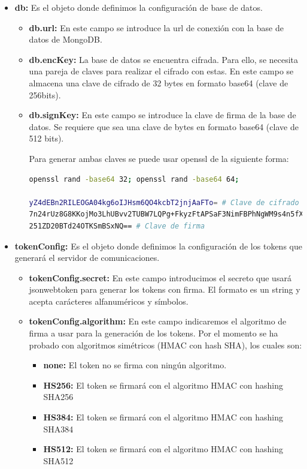 \documentclass[spanish,12pt, a4paper, twoside]{paper}
\begin{document}
\begin{itemize}
\item\textbf{db:} Es el objeto donde definimos la configuración de base de datos.
\begin{itemize}
\item\textbf{db.url:} En este campo se introduce la url de conexión con la base de datos de MongoDB.

\item\textbf{db.encKey:} La base de datos se encuentra cifrada. Para ello, se necesita una pareja de claves para realizar el cifrado con estas. En este campo se almacena una clave de cifrado de 32 bytes en formato base64 (clave de 256bits).

\item\textbf{db.signKey:} En este campo se introduce la clave de firma de la base de datos. Se requiere que sea una clave de bytes en formato base64 (clave de 512 bits).

Para generar ambas claves se puede usar openssl de la siguiente forma:
\begin{lstlisting}[language=sh]
openssl rand -base64 32; openssl rand -base64 64;

yZ4dEBn2RILEOGA04kg6oIJHsm6QO4kcbT2jnjAaFTo= # Clave de cifrado
7n24rUz8G8KKojMo3LhUBvv2TUBW7LQPg+FkyzFtAPSaF3NimFBPhNgWM9s4n5fX
251ZD20BTd24OTKSmBSxNQ== # Clave de firma
\end{lstlisting}
\end{itemize}

\item\textbf{tokenConfig:} Es el objeto donde definimos la configuración de los tokens que generará el servidor de comunicaciones.

\begin{itemize}
\item\textbf{tokenConfig.secret:} En este campo introducimos el secreto que usará jsonwebtoken para generar los tokens con firma. El formato es un string y acepta carácteres alfanuméricos y símbolos.

\item\textbf{tokenConfig.algorithm:} En este campo indicaremos el algoritmo de firma a usar para la generación de los tokens. Por el momento se ha probado con algoritmos simétricos (HMAC con hash SHA), los cuales son:
\begin{itemize}
\item\textbf{none:} El token no se firma con ningún algoritmo.
\item\textbf{HS256:} El token se firmará con el algoritmo HMAC con hashing SHA256
\item\textbf{HS384:} El token se firmará con el algoritmo HMAC con hashing SHA384
\item\textbf{HS512:} El token se firmará con el algoritmo HMAC con hashing SHA512
\end{itemize}


\end{itemize}
\end{itemize}
\end{document}
